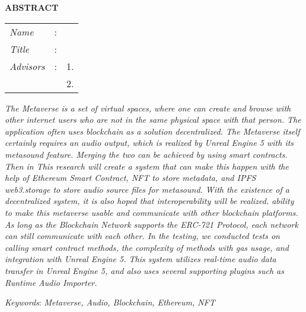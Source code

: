 \begin{center}
  \large\textbf{ABSTRACT}
\end{center}


\vspace{2ex}

\begingroup
\setlength{\tabcolsep}{0pt}

\noindent
\begin{tabularx}{\textwidth}{l >{\centering}m{3em} X}
  \emph{Name}     & : & \name{}         \\

  \emph{Title}    & : & \engtatitle{}   \\

  \emph{Advisors} & : & 1. \advisor{}   \\
                  &   & 2. \coadvisor{} \\
\end{tabularx}
\endgroup

\emph{The Metaverse is a set of virtual spaces, where one can create and browse with other internet users who are not in the same physical space
  with that person. The application often uses blockchain as a solution
  decentralized. The Metaverse itself certainly requires an audio output, which is realized
  by Unreal Engine 5 with its metasound feature.
  Merging the two can be achieved by using smart contracts. Then in
  This research will create a system that can make this happen with the help of Ethereum
  Smart Contract, NFT to store metadata, and IPFS web3.storage to store
  audio source files for metasound.
  With the existence of a decentralized system, it is also hoped that interoperability will be realized.
  ability to make this metaverse usable and communicate with other blockchain platforms.
  As long as the Blockchain Network supports the ERC-721 Protocol, each network can still communicate with 
  each other. In the testing, we conducted tests on calling smart contract methods, the complexity of methods 
  with gas usage, and integration with Unreal Engine 5. This system utilizes real-time audio data transfer in 
  Unreal Engine 5, and also uses several supporting plugins such as Runtime Audio Importer.}

\emph{Keywords}: \emph{Metaverse, Audio, Blockchain, Ethereum, NFT}
